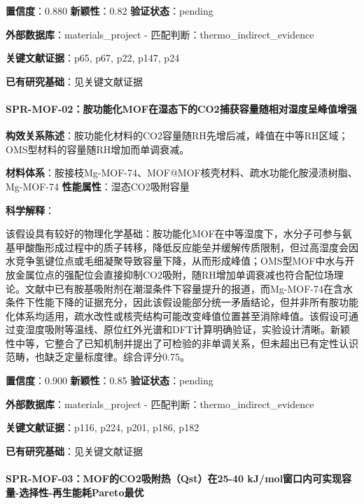\documentclass[12pt,a4paper]{ctexart}
\begin{document}
\textbf{置信度}：0.880 \textbar{} \textbf{新颖性}：0.82 \textbar{} \textbf{验证状态}：pending

\textbf{外部数据库}：materials\_project - 匹配判断：thermo\_indirect\_evidence

\textbf{关键文献证据}：p65, p67, p22, p147, p24

\textbf{已有研究基础}：见关键文献证据

\paragraph{SPR-MOF-02：胺功能化MOF在湿态下的CO2捕获容量随相对湿度呈峰值增强}\label{spr-mof-02ux80faux529fux80fdux5316mofux5728ux6e7fux6001ux4e0bux7684co2ux6355ux83b7ux5bb9ux91cfux968fux76f8ux5bf9ux6e7fux5ea6ux5448ux5cf0ux503cux589eux5f3a}

\textbf{构效关系陈述}：胺功能化材料的CO2容量随RH先增后减，峰值在中等RH区域；OMS型材料的容量随RH增加而单调衰减。

\textbf{材料体系}：胺接枝Mg-MOF-74、MOF@MOF核壳材料、疏水功能化胺浸渍树脂、Mg-MOF-74 \textbar{} \textbf{性能属性}：湿态CO2吸附容量

\textbf{科学解释}：

该假设具有较好的物理化学基础：胺功能化MOF在中等湿度下，水分子可参与氨基甲酸酯形成过程中的质子转移，降低反应能垒并缓解传质限制，但过高湿度会因水竞争氢键位点或毛细凝聚导致容量下降，从而形成峰值；OMS型MOF中水与开放金属位点的强配位会直接抑制CO2吸附，随RH增加单调衰减也符合配位场理论。文献中已有胺基吸附剂在潮湿条件下容量提升的报道，而Mg-MOF-74在含水条件下性能下降的证据充分，因此该假设能部分统一矛盾结论，但并非所有胺功能化体系均适用，疏水改性或核壳结构可能改变峰值位置甚至消除峰值。该假设可通过变湿度吸附等温线、原位红外光谱和DFT计算明确验证，实验设计清晰。新颖性中等，它整合了已知机制并提出了可检验的非单调关系，但未超出已有定性认识范畴，也缺乏定量标度律。综合评分0.75。

\textbf{置信度}：0.900 \textbar{} \textbf{新颖性}：0.85 \textbar{} \textbf{验证状态}：pending

\textbf{外部数据库}：materials\_project - 匹配判断：thermo\_indirect\_evidence

\textbf{关键文献证据}：p116, p224, p201, p186, p182

\textbf{已有研究基础}：见关键文献证据

\paragraph{SPR-MOF-03：MOF的CO2吸附热（Qst）在25-40 kJ/mol窗口内可实现容量-选择性-再生能耗Pareto最优}\label{spr-mof-03mofux7684co2ux5438ux9644ux70edqstux572825-40-kjmolux7a97ux53e3ux5185ux53efux5b9eux73b0ux5bb9ux91cf-ux9009ux62e9ux6027-ux518dux751fux80fdux8017paretoux6700ux4f18}
\end{document}
